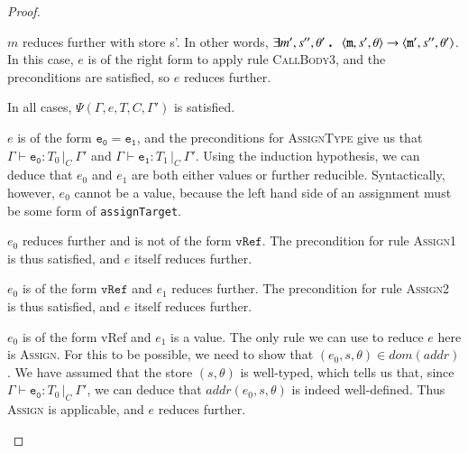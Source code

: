 \documentclass[12pt,a4paper,twoside,openright]{report}
\theoremstyle{definition}
\theoremstyle{dotless}
\newcommand{\typed}[2]{\Gamma{}\vdash\mathtt{#1}: #2\,|_C\:\Gamma'}
\newcommand{\transition}[6]{\langle{}\mathtt{#1},#2,#3\rangle{}\rightarrow{}\langle{}\mathtt{#4},#5,#6\rangle}
\newcommand{\indHypTwo}{\Psi(\Gamma, e, T, C, \Gamma')}
\newcommand\qdot{\mathbin{\scalebox{1.5}{.}}\enspace}
\begin{document}
\begin{proof}
\begin{case}[VoidBodyType]
	  \begin{subcase}
	  	$m$ reduces further with store s'.
	  	In other words, $\exists m', s'', \theta'\qdot \transition{m}{s'}{\theta}{m'}{s''}{\theta'}$.
	  	In this case, $e$ is of the right form to apply rule \textsc{CallBody3},
	  	and the preconditions are satisfied, so $e$ reduces further. 
	  \end{subcase}

	  In all cases, $\indHypTwo$ is satisfied.

  	\end{case}

  \begin{case}[AssignType]\label{assigntype}

	$e$ is of the form $\mathtt{e_0 = e_1}$, and the preconditions for \textsc{AssignType} give us that
	$\typed{e_0}{T_0}$ and $\typed{e_1}{T_1}$. Using the
	induction hypothesis, we can deduce that $e_0$ and $e_1$ are both either values
	or further reducible. Syntactically, however, $e_0$ cannot be a value, because the left
	hand side of an assignment must be some form of \texttt{assignTarget}.

	\begin{subcase}
	  $e_0$ reduces further and is not of the form $\mathtt{vRef}$. 
	  The precondition for rule \textsc{Assign1} is thus satisfied, and $e$
	  itself reduces further.
	\end{subcase}

	\begin{subcase}
	  $e_0$ is of the form $\mathtt{vRef}$ and $e_1$ reduces further. 
	  The precondition for rule \textsc{Assign2} is thus satisfied, and $e$
	  itself reduces further.
	\end{subcase}

	\begin{subcase}
	  $e_0$ is of the form vRef and $e_1$ is a value.
	  The only rule we can use to reduce $e$ here is \textsc{Assign}. For this
	  to be possible, we need to show that $(e_0, s, \theta) \in dom(addr)$.
	  We have assumed that the store $(s,\theta)$ is well-typed, which tells us
	  that, since $\typed{e_0}{T_0}$, we can deduce that $addr(e_0,s,\theta)$
	  is indeed well-defined. Thus \textsc{Assign} is applicable, and $e$
	  reduces further.  
	\end{subcase}

  \end{case}

\end{proof}
\end{document}
